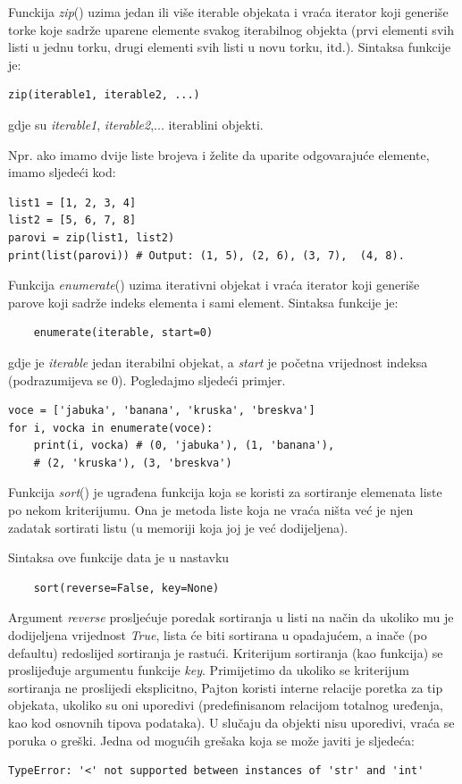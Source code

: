 Funckija \textit{zip}() uzima jedan ili više iterable objekata i vraća iterator koji generiše torke koje sadrže uparene elemente svakog iterabilnog objekta (prvi elementi svih listi u jednu torku, drugi elementi svih listi u novu torku, itd.). Sintaksa funkcije je:
\begin{verbatim}
zip(iterable1, iterable2, ...)
\end{verbatim}
gdje su \emph{iterable1}, \emph{iterable2},... iterablini objekti. 

Npr. ako imamo dvije liste brojeva i želite da uparite odgovarajuće elemente, imamo sljedeći kod:
\begin{verbatim}
list1 = [1, 2, 3, 4]
list2 = [5, 6, 7, 8]
parovi = zip(list1, list2) 
print(list(parovi)) # Output: (1, 5), (2, 6), (3, 7),  (4, 8).
\end{verbatim}
Funkcija \textit{enumerate}() uzima iterativni objekat i vraća iterator koji generiše parove koji sadrže indeks elementa i sami element. Sintaksa funkcije je:
\begin{verbatim}
	enumerate(iterable, start=0)
\end{verbatim}
gdje je \textit{iterable} jedan iterabilni objekat, a \textit{start} je početna vrijednost indeksa (podrazumijeva se 0). Pogledajmo sljedeći primjer. 

\begin{verbatim}
voce = ['jabuka', 'banana', 'kruska', 'breskva']
for i, vocka in enumerate(voce):
    print(i, vocka) # (0, 'jabuka'), (1, 'banana'),
    # (2, 'kruska'), (3, 'breskva')
\end{verbatim}

Funkcija \textit{sort}() je ugrađena funkcija koja se koristi za sortiranje elemenata   liste po nekom kriterijumu. Ona je metoda liste koja ne vraća ništa već je njen zadatak sortirati listu (u memoriji koja joj je već dodijeljena).

Sintaksa ove funkcije data je u nastavku 
\begin{verbatim}
	sort(reverse=False, key=None)
\end{verbatim}

Argument \textit{reverse} prosljećuje poredak sortiranja u listi na način da ukoliko mu je dodijeljena vrijednost \emph{True}, lista će biti sortirana u opadajućem, a inače (po defaultu) redoslijed sortiranja je rastući. Kriterijum sortiranja (kao funkcija) se proslijeđuje argumentu funkcije \textit{key}. Primijetimo da ukoliko se kriterijum sortiranja ne proslijedi eksplicitno, Pajton koristi interne relacije poretka za tip objekata, ukoliko su oni uporedivi (predefinisanom relacijom totalnog uređenja, kao kod osnovnih tipova podataka). U slučaju da objekti nisu uporedivi, vraća se poruka o greški.  Jedna od mogućih grešaka koja se može javiti je sljedeća:
\begin{verbatim}
TypeError: '<' not supported between instances of 'str' and 'int'
\end{verbatim}


